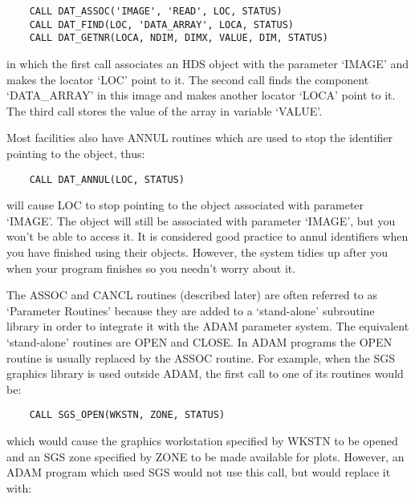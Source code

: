 \begin{small}
\begin{verbatim}
    CALL DAT_ASSOC('IMAGE', 'READ', LOC, STATUS)
    CALL DAT_FIND(LOC, 'DATA_ARRAY', LOCA, STATUS)
    CALL DAT_GETNR(LOCA, NDIM, DIMX, VALUE, DIM, STATUS)
\end{verbatim}
\end{small}

in which the first call associates an HDS object with the parameter `IMAGE'
and makes the locator `LOC' point to it.
The second call finds the component `DATA\_ARRAY' in this image and makes
another locator `LOCA' point to it.
The third call stores the value of the array in variable `VALUE'.

Most facilities also have ANNUL routines which are used to stop the identifier
pointing to the object, thus:

\begin{small}
\begin{verbatim}
    CALL DAT_ANNUL(LOC, STATUS)
\end{verbatim}
\end{small}

will cause LOC to stop pointing to the object associated with parameter `IMAGE'.
The object will still be associated with parameter `IMAGE', but you won't be
able to access it.
It is considered good practice to annul identifiers when you have finished
using their objects.
However, the system tidies up after you when your program finishes so you
needn't worry about it.

The ASSOC and CANCL routines (described later) are often referred to as 
`Parameter Routines' because they are added to a `stand-alone' subroutine
library in order to integrate it with the ADAM parameter system.
The equivalent `stand-alone' routines are OPEN and CLOSE.
In ADAM programs the OPEN routine is usually replaced by the ASSOC routine.
For example, when the SGS graphics library is used outside ADAM, the first
call to one of its routines would be:

\begin{small}
\begin{verbatim}
    CALL SGS_OPEN(WKSTN, ZONE, STATUS)
\end{verbatim}
\end{small}

which would cause the graphics workstation specified by WKSTN to be opened and
an SGS zone specified by ZONE to be made available for plots.
However, an ADAM program which used SGS would not use this call, but would
replace it with:

